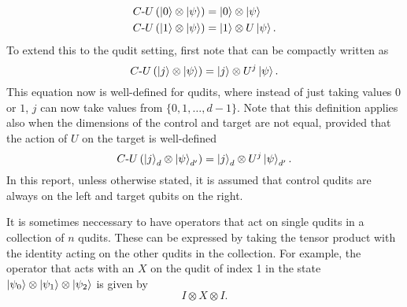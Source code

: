 \begin{align}
    C\text{-}U\left(\ket{0}\otimes\ket{\psi}\right) &= \ket{0}\otimes\ket{\psi}
    \label{eq:controlled_0}\\
    C\text{-}U\left(\ket{1}\otimes\ket{\psi}\right) &= \ket{1}\otimes U\ket{\psi}.
    \label{eq:controlled_1}
\end{align}
To extend this to the qudit setting, first note that  can be compactly written as
\begin{equation}
    C\text{-}U\left(\ket{j}\otimes\ket{\psi}\right) = \ket{j}\otimes U^j\ket{\psi}.
    \label{eq:controlled_x}
\end{equation}
This equation now is well-defined for qudits, where instead of just taking values $0$ or $1$, $j$ can now take values from $\{0, 1, \dots, d-1\}$.
Note that this definition applies also when the dimensions of the control and target are not equal, provided that the action of $U$ on the target is well-defined
\begin{equation}
    C\text{-}U\left(\ket{j}_d\otimes\ket{\psi}_{d'}\right) = \ket{j}_d\otimes U^j\ket{\psi}_{d'}.
\end{equation}
In this report, unless otherwise stated, it is assumed that control qudits are always on the left and target qubits on the right.

It is sometimes neccessary to have operators that act on single qudits in a collection of $n$ qudits.
These can be expressed by taking the tensor product with the identity acting on the other qudits in the collection.
For example, the operator that acts with an $X$ on the qudit of index 1 in the state $\ket{\psi_0}\otimes\ket{\psi_1}\otimes\ket{\psi_2}$ is given by
\begin{equation}
    I\otimes X\otimes I.
\end{equation}

